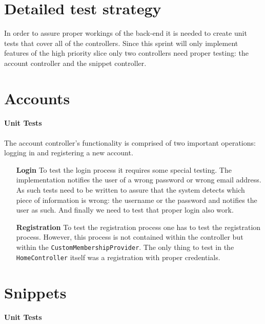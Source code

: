 \documentclass[10pt,a4paper,BCOR12mm, headexclude, footexclude,
  twoside, openright]{scrartcl}
\numberwithin{equation}{section} %
\numberwithin{figure}{section} %
\numberwithin{table}{section} %
\begin{document}
\pagestyle{plain}

\section{Detailed test strategy}
In order to assure proper workings of the back-end it is needed to create unit
tests that cover all of the controllers. Since this sprint will only implement
features of the high priority slice only two controllers need proper testing:
the account controller and the snippet controller.

\section{Accounts}

\paragraph{Unit Tests}

The account controller's functionality is comprised of two important operations:
logging in and registering a new account.

\begin{itemize}

\item[\textbf{Login}]To test the login process it requires some special
  testing. The implementation notifies the user of a wrong password or wrong
  email address. As such tests need to be written to assure that the system
  detects which piece of information is wrong: the username or the password and
  notifies the user as such. And finally we need to test that proper login also
  work.

\item[\textbf{Registration}] To test the registration process one has to test
  the registration process. However, this process is not contained within the
  controller but within the \texttt{Custom\-Member\-ship\-Provider}. The only
  thing to test in the \texttt{HomeController} itself was a registration with
  proper credentials.

\end{itemize}



\section{Snippets}
\paragraph{Unit Tests}
\end{document}
